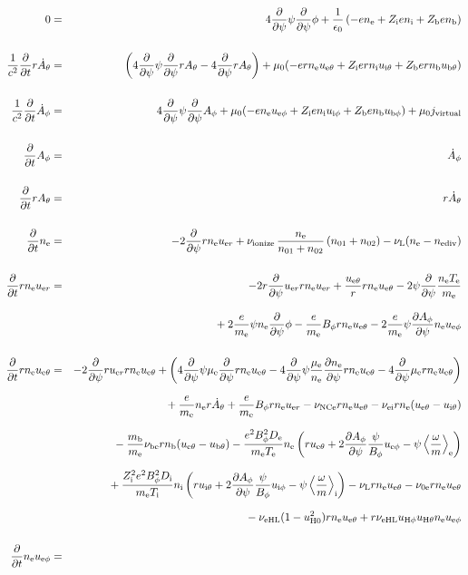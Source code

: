 \documentclass[11pt]{article}
\def\r#1{{\rm#1}}
\def\ddt{\frac{\partial}{\partial t}}
\def\ddp{\frac{\partial}{\partial \psi}}
\def\dd#1{\frac{\partial #1}{\partial \psi}}
\def\ave#1{\left\langle#1\right\rangle}
\def\me{m_\r{e}}
\def\mb{m_\r{b}}
\def\mue{\mu_\r{e}}
\def\De{D_\r{e}}
\def\Di{D_\r{i}}
\def\ne{n_\r{e}}
\def\ni{n_\r{i}}
\def\nb{n_\r{b}}
\def\uer{u_{\r{e}r}}
\def\ueth{u_{\r{e}\theta}}
\def\uith{u_{\r{i}\theta}}
\def\ubth{u_{\r{b}\theta}}
\def\ueph{u_{\r{e}\phi}}
\def\uiph{u_{\r{i}\phi}}
\def\ubph{u_{\r{b}\phi}}
\def\Bph{B_\phi}
\def\Athd{\dot{A}_\theta}
\def\Aphd{\dot{A}_\phi}
\def\Ath{A_\theta}
\def\Aph{A_\phi}
\def\Te{T_\r{e}}
\def\Ti{T_\r{i}}
\def\nna{n_{01}}
\def\nnb{n_{02}}
\def\Zi{Z_\r{i}}
\def\Zb{Z_\r{b}}
\def\nuNCe{\nu_\r{NCe}}
\def\nune{\nu_\r{0e}}
\def\nuL{\nu_\r{L}}
\def\nuion{\nu_\r{ionize}}
\def\nediv{n_\r{ediv}}
\begin{document}
\begin{eqnarray}
%
% 
  0 &=&
%
    4 \ddp \psi \ddp \phi
%
  + \frac{1}{\epsilon_0}
%
    \left(-e \ne + \Zi e \ni + \Zb e \nb \right)
\\[5mm]
%
%
  \frac{1}{c^2} \ddt r \Athd &=&
%
    \left(   4 \ddp \psi \ddp r \Ath
%
           - 4 \ddp r \Ath \right)
%
  + \mu_0 (-e r \ne \ueth + \Zi e r \ni \uith + \Zb e r \nb \ubth)
\\[5mm]
%
%
  \frac{1}{c^2} \ddt \Aphd &=&
%
    4 \ddp \psi \ddp \Aph
%
  + \mu_0 (-e \ne \ueph + \Zi e \ni \uiph + \Zb e \nb \ubph) + \mu_0 j_\r{virtual}
\\[5mm]
%
%
  \ddt \Aph &=&
%
  \Aphd
\\[5mm]
%
%
  \ddt r \Ath &=&
%
  r \Athd
\\[5mm]
%
%
  \ddt \ne &=&
%
  - 2 \ddp r \ne \uer 
%
  + \nuion\, \frac{\ne}{\nna+\nnb}\, (\nna+\nnb)
%
  - \nuL (\ne - \nediv)
\\[5mm]
%
%
  \ddt r \ne \uer &=&
%
  - 2 r \ddp \uer r \ne \uer
%
  + \frac{\ueth}{r} r \ne \ueth
%
  - 2 \psi \ddp \frac{\ne \Te}{\me}
\nonumber\\[3mm]&&{}
%
  + 2 \frac{e}{\me} \psi \ne \ddp \phi
%
  - \frac{e}{\me} \Bph r \ne \ueth
%
  - 2 \frac{e}{\me} \psi \dd{\Aph} \ne \ueph
\\[5mm]
%
%
  \ddt r \ne \ueth &=&
%
  - 2 \ddp r \uer r \ne \ueth
%
  + \left(    4 \ddp \psi \mue \ddp r \ne \ueth
%
            - 4 \ddp \psi \frac{\mue}{\ne} \dd{\ne} r \ne \ueth
%
            - 4 \ddp \mue r \ne \ueth \right)
\nonumber\\[2.5mm]&&{}
%
  + \frac{e}{\me} \ne r \Athd
%
  + \frac{e}{\me} \Bph r \ne \uer
%
  - \nuNCe r \ne \ueth
%
  - \nu_\r{ei} r \ne (\ueth - \uith)
\nonumber\\[2.5mm]&&{}
%
  - \frac{\mb}{\me} \nu_\r{be} r \nb (\ueth - \ubth)
%
  - \frac{e^2 \Bph^2 \De}{\me\Te}\ne
    \left(r \ueth + 2\dd{\Aph}\frac{\psi}{\Bph}\ueph - \psi
     \ave{\frac{\omega}{m}}_\r{e} \right)
\nonumber\\[2.5mm]&&{}
%
   + \frac{\Zi^2 e^2 \Bph^2 \Di}{\me\Ti}\ni
    \left(r \uith + 2\dd{\Aph}\frac{\psi}{\Bph}\uiph - \psi
     \ave{\frac{\omega}{m}}_\r{i} \right)
%
  - \nuL r \ne \ueth
%
  - \nune r \ne \ueth
\nonumber\\[2.5mm]&&{}
%
  - \nu_\r{eHL} (1 - u_\r{H0}^2) r \ne \ueth
%
  + r \nu_\r{eHL} u_{\r{H}\phi} u_{\r{H}\theta} \ne \ueph
\\[5mm]
%
%
  \ddt \ne \ueph &=&

\end{eqnarray}
\end{document}
